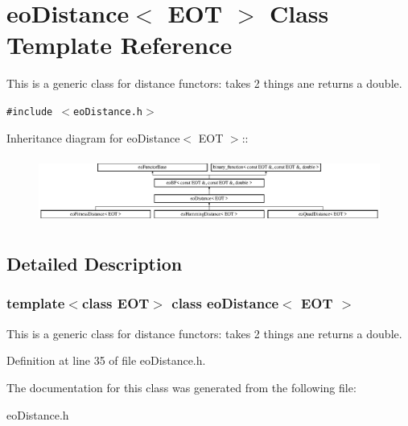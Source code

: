 \section{eo\-Distance$<$ EOT $>$ Class Template Reference}
\label{classeo_distance}
This is a generic class for distance functors: takes 2 things ane returns a double.  


{\tt \#include $<$eo\-Distance.h$>$}

Inheritance diagram for eo\-Distance$<$ EOT $>$::\begin{figure}[H]
\begin{center}
\leavevmode
\includegraphics[height=2.22222cm]{classeo_distance}
\end{center}
\end{figure}


\subsection{Detailed Description}
\subsubsection*{template$<$class EOT$>$ class eo\-Distance$<$ EOT $>$}

This is a generic class for distance functors: takes 2 things ane returns a double. 



Definition at line 35 of file eo\-Distance.h.

The documentation for this class was generated from the following file:\begin{CompactItemize}
\item 
eo\-Distance.h\end{CompactItemize}
